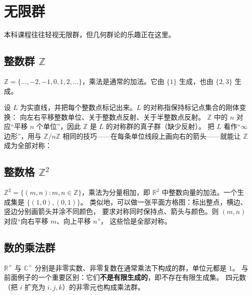 \documentclass[11pt,a4paper]{article}
\theoremstyle{definition}
\theoremstyle{plain}
\theoremstyle{remark}
\newcommand{\Z}{\mathbb{Z}}
\newcommand{\R}{\mathbb{R}}
\newcommand{\C}{\mathbb{C}}
\begin{document}
\section{无限群}

本科课程往往轻视无限群，但几何群论的乐趣正在这里。

\subsection{整数群 $\Z$}

$\Z=\{\dots,-2,-1,0,1,2,\dots\}$，乘法是通常的加法。它由 $\{1\}$ 生成，也由 $\{2,3\}$ 生成。

设 $L$ 为实直线，并把每个整数点标记出来。$L$ 的对称指保持标记点集合的刚体变换：
向左右平移整数单位、关于整数点反射、关于半整数点反射。
$\Z$ 中的 $n$ 对应“平移 $n$ 个单位”，因此 $\Z$ 是 $L$ 的对称群的真子群（缺少反射）。
把 $L$ 看作“$\infty$ 边形”，用与 $\Z/n\Z$ 相同的技巧——在每条单位线段上画向右的箭头——就能让 $\Z$ 成为全部对称：
\begin{center}
\end{center}

\subsection{整数格 $\Z^2$}

$\Z^2=\{(m,n): m,n\in\Z\}$，乘法为分量相加，即 $\R^2$ 中整数向量的加法。一个生成集是 $\{(1,0),(0,1)\}$。
类似地，可以做一张平面方格图：标出整点，横边、竖边分别画箭头并涂不同颜色，
要求对称同时保持点、箭头与颜色。则 $(m,n)$ 对应“向右平移 $m$、向上平移 $n$”，
这些恰是全部对称。

\subsection{数的乘法群}

$\R^{\times}$ 与 $\C^{\times}$ 分别是非零实数、非零复数在通常乘法下构成的群，单位元都是 $1$。
与前面例子的一个重要区别：它们\textbf{不是有限生成的}，即不存在有限生成集。
四元数（把 $i$ 扩充为 $i,j,k$）的非零元也构成乘法群。
\end{document}
